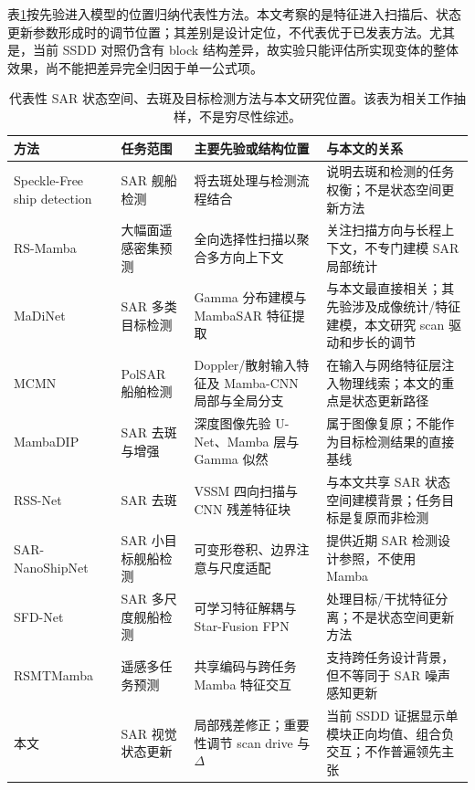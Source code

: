 \documentclass[UTF8,12pt,a4paper]{ctexart}
\begin{document}
表\ref{tab:related_position}按先验进入模型的位置归纳代表性方法。本文考察的是特征进入扫描后、状态更新参数形成时的调节位置；其差别是设计定位，不代表优于已发表方法。尤其是，当前 SSDD 对照仍含有 block 结构差异，故实验只能评估所实现变体的整体效果，尚不能把差异完全归因于单一公式项。

\begin{table}[H]\centering\scriptsize
\caption{代表性 SAR 状态空间、去斑及目标检测方法与本文研究位置。该表为相关工作抽样，不是穷尽性综述。}
\label{tab:related_position}
\begin{tabularx}{\linewidth}{p{3.2cm}p{2.25cm}p{3.7cm}X}
\toprule
方法 & 任务范围 & 主要先验或结构位置 & 与本文的关系\\
\midrule
Speckle-Free ship detection\cite{specklefree} & SAR 舰船检测 & 将去斑处理与检测流程结合 & 说明去斑和检测的任务权衡；不是状态空间更新方法\\
RS-Mamba\cite{rs_mamba} & 大幅面遥感密集预测 & 全向选择性扫描以聚合多方向上下文 & 关注扫描方向与长程上下文，不专门建模 SAR 局部统计\\
MaDiNet\cite{madinet} & SAR 多类目标检测 & Gamma 分布建模与 MambaSAR 特征提取 & 与本文最直接相关；其先验涉及成像统计/特征建模，本文研究 scan 驱动和步长的调节\\
MCMN\cite{mcmn} & PolSAR 船舶检测 & Doppler/散射输入特征及 Mamba-CNN 局部与全局分支 & 在输入与网络特征层注入物理线索；本文的重点是状态更新路径\\
MambaDIP\cite{mambadip} & SAR 去斑与增强 & 深度图像先验 U-Net、Mamba 层与 Gamma 似然 & 属于图像复原；不能作为目标检测结果的直接基线\\
RSS-Net\cite{rssnet} & SAR 去斑 & VSSM 四向扫描与 CNN 残差特征块 & 与本文共享 SAR 状态空间建模背景；任务目标是复原而非检测\\
SAR-NanoShipNet\cite{sarnano} & SAR 小目标舰船检测 & 可变形卷积、边界注意与尺度适配 & 提供近期 SAR 检测设计参照，不使用 Mamba\\
SFD-Net\cite{sfdnet} & SAR 多尺度舰船检测 & 可学习特征解耦与 Star-Fusion FPN & 处理目标/干扰特征分离；不是状态空间更新方法\\
RSMTMamba\cite{rstmtmamba} & 遥感多任务预测 & 共享编码与跨任务 Mamba 特征交互 & 支持跨任务设计背景，但不等同于 SAR 噪声感知更新\\
本文 & SAR 视觉状态更新 & 局部残差修正；重要性调节 scan drive 与 $\Delta$ & 当前 SSDD 证据显示单模块正向均值、组合负交互；不作普遍领先主张\\
\bottomrule
\end{tabularx}
\end{table}
\end{document}
